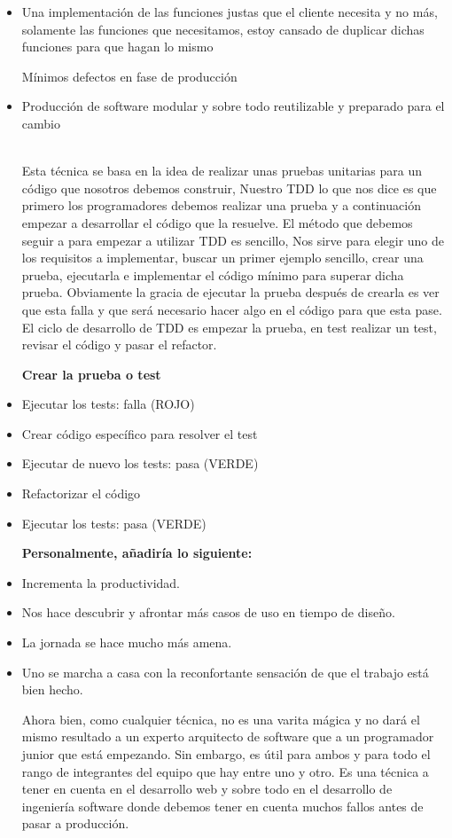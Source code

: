 \begin{flushleft}

\begin{itemize}

	\item Una implementación de las funciones justas que el cliente necesita y no más, solamente las funciones que necesitamos, estoy cansado de duplicar dichas funciones para que hagan lo mismo

	 Mínimos defectos en fase de producción

	\item Producción de software modular y sobre todo reutilizable y preparado para el cambio


\textbf{}\\
Esta técnica se basa en la idea de realizar unas pruebas unitarias para un código que nosotros debemos construir, Nuestro TDD lo que nos dice es que primero los programadores debemos realizar una prueba y a continuación empezar a desarrollar el código que la resuelve.
El método que debemos seguir a para empezar a utilizar TDD es sencillo, Nos sirve para elegir uno de los requisitos a implementar, buscar un primer ejemplo sencillo, crear una prueba, ejecutarla e implementar el código mínimo para superar dicha prueba.
Obviamente la gracia de ejecutar la prueba después de crearla es ver que esta falla y que será necesario hacer algo en el código para que esta pase.
El ciclo de desarrollo de TDD es empezar la prueba, en test realizar un test, revisar el código y pasar el refactor.

\textbf {Crear la prueba o test}
\item Ejecutar los tests: falla (ROJO)
\item Crear código específico para resolver el test
\item Ejecutar de nuevo los tests: pasa (VERDE)
\item Refactorizar el código
\item Ejecutar los tests: pasa (VERDE)

\textbf {Personalmente, añadiría lo siguiente:}
\item Incrementa la productividad.
\item Nos hace descubrir y afrontar más casos de uso en tiempo de diseño.
\item La jornada se hace mucho más amena.
\item Uno se marcha a casa con la reconfortante sensación de que el trabajo está bien hecho.


Ahora bien, como cualquier técnica, no es una varita mágica y no dará el mismo resultado a un experto arquitecto de software que a un programador junior que está empezando. Sin embargo, es útil para ambos y para todo el rango de integrantes del equipo que hay entre uno y otro.
Es una técnica a tener en cuenta en el desarrollo web y sobre todo en el desarrollo de ingeniería software donde debemos tener en cuenta muchos fallos antes de pasar a producción.







	

\end{itemize} 


\end{flushleft}